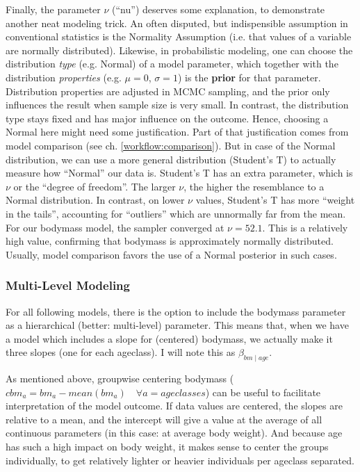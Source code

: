 Finally, the parameter \(\nu\) (``nu'') deserves some explanation, to demonstrate another neat modeling trick.
An often disputed, but indispensible assumption in conventional statistics is the Normality Assumption (i.e. that values of a variable are normally distributed).
Likewise, in probabilistic modeling, one can choose the distribution \emph{type} (e.g. Normal) of a model parameter, which together with the distribution \emph{properties} (e.g. \(\mu = 0\), \(\sigma = 1\)) is the \textbf{prior} for that parameter.
Distribution properties are adjusted in MCMC sampling, and the prior only influences the result when sample size is very small.
In contrast, the distribution type stays fixed and has major influence on the outcome.
Hence, choosing a Normal here might need some justification.
Part of that justification comes from model comparison (see ch. \ref{workflow:comparison}).
But in case of the Normal distribution, we can use a more general distribution (Student's T) to actually measure how ``Normal'' our data is.
Student's T has an extra parameter, which is \(\nu\) or the ``degree of freedom''.
The larger \(\nu\), the higher the resemblance to a Normal distribution.
In contrast, on lower \(\nu\) values, Student's T has more ``weight in the tails'', accounting for ``outliers'' which are unnormally far from the mean.
For our bodymass model, the sampler converged at \(\nu = 52.1\).
This is a relatively high value, confirming that bodymass is approximately normally distributed.
Usually, model comparison favors the use of a Normal posterior in such cases.


\subsubsection{Multi-Level Modeling}
\label{sec:org25b6e1a}
For all following models, there is the option to include the bodymass parameter as a hierarchical (better: multi-level) parameter.
This means that, when we have a model which includes a slope for (centered) bodymass, we actually make it three slopes (one for each ageclass). I will note this as \(\beta_{bm\mid age}\).

As mentioned above, groupwise centering bodymass (\(cbm_a = bm_a - mean(bm_a)\quad \forall a = {ageclasses}\)) can be useful to facilitate interpretation of the model outcome.
If data values are centered, the slopes are relative to a mean, and the intercept will give a value at the average of all continuous parameters (in this case: at average body weight).
And because age has such a high impact on body weight, it makes sense to center the groups individually, to get relatively lighter or heavier individuals per ageclass separated.


